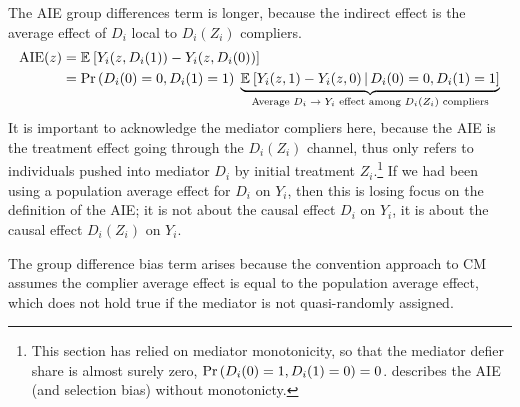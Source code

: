 The AIE group differences term is longer, because the indirect effect is the average effect of $D_i$ local to $D_i(Z_i)$ compliers.
\begin{align*}
    \text{AIE}(z)
    &= \mathbb{E}_{} \left[ Y_i(z, D_i(1)) - Y_i(z, D_i(0)) \right] \\
    &= \Pr\left( D_i(0) = 0, D_i(1) = 1 \right) \; 
        \underbrace{\mathbb{E}_{} \left[ Y_i(z, 1) - Y_i(z, 0) \, \middle\vert \, D_i(0) = 0, D_i(1) = 1 \right]}_{
            \text{Average $D_i \to Y_i$ effect among $D_i(Z_i)$ compliers}
        }
\end{align*}
It is important to acknowledge the mediator compliers here, because the AIE is the treatment effect going through the $D_i(Z_i)$ channel, thus only refers to individuals pushed into mediator $D_i$ by initial treatment $Z_i$.\footnote{
    This section has relied on mediator monotonicity, so that the mediator defier share is almost surely zero, $\Pr\left( D_i(0) = 1, D_i(1) = 0 \right) = 0$.
     describes the AIE (and selection bias) without monotonicty.
}
If we had been using a population average effect for $D_i$ on $Y_i$, then this is losing focus on the definition of the AIE; it is not about the causal effect $D_i$ on $Y_i$, it is about the causal effect $D_i(Z_i)$ on $Y_i$.

The group difference bias term arises because the convention approach to CM assumes the complier average effect is equal to the population average effect, which does not hold true if the mediator is not quasi-randomly assigned.
